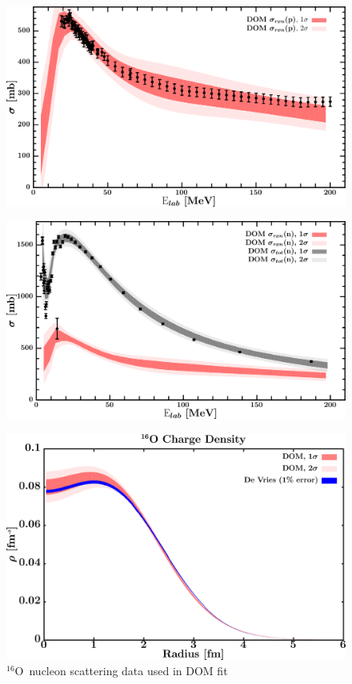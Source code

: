 \documentclass[twocolumn,secnumarabic,amssymb, nobibnotes, aps, prl,
superscriptaddress, nobalancelastpage, draft]{revtex4}
\newcommand{\oSix}{\ensuremath{^{16}}O}
\begin{document}
\begin{figure}[!htb]
\begin{minipage}{0.4\linewidth}
        \label{DOM_o16_neutron_elastic}
    \end{minipage}
    \centering
    \begin{minipage}{0.4\linewidth}
        \centering
        \includegraphics[width=\linewidth]{figures/o16_protonInelastic.png}
        \label{DOM_o16_proton_inelastic}
    \end{minipage}\hspace{6pt}
    \begin{minipage}{0.4\linewidth}
        \centering
        \includegraphics[width=\linewidth]{figures/o16_neutronInelastic.png}
        \label{DOM_o16_neutron_inelastic}
    \end{minipage}
    \caption{\oSix\ nucleon scattering data used in DOM fit}
    \label{DOM_o16_scattering}
    \centering
    \begin{minipage}{0.4\linewidth}
        \centering
        \includegraphics[width=\linewidth]{figures/o16_chargeDensity.png}

\end{minipage}
\end{figure}
\end{document}
